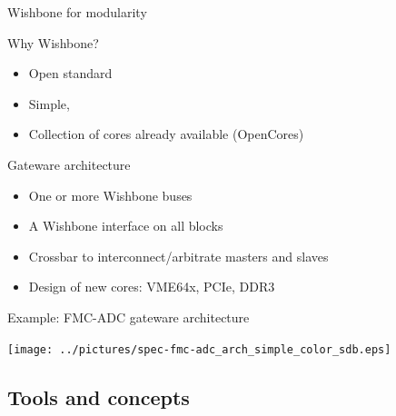 \documentclass[compress,red]{beamer}
\begin{document}
\begin{frame}{Wishbone for modularity}

  \begin{block}{Why Wishbone?}
    \begin{itemize}
    \item Open standard
    \item Simple, %
    \item Collection of cores already available (OpenCores)
    \end{itemize}
  \end{block}

  \begin{block}{Gateware architecture}
    \begin{itemize}
    \item One or more Wishbone buses
    \item A Wishbone interface on all blocks
    \item Crossbar to interconnect/arbitrate masters and slaves
    \item Design of new cores: VME64x, PCIe, DDR3
    \end{itemize}
  \end{block}

\end{frame}

\begin{frame}{Example: FMC-ADC gateware architecture}

  \begin{center}
    \texttt{[image: ../pictures/spec-fmc-adc\_arch\_simple\_color\_sdb.eps]}
  \end{center}

\end{frame}

\subsection{Tools and concepts}
\end{document}
